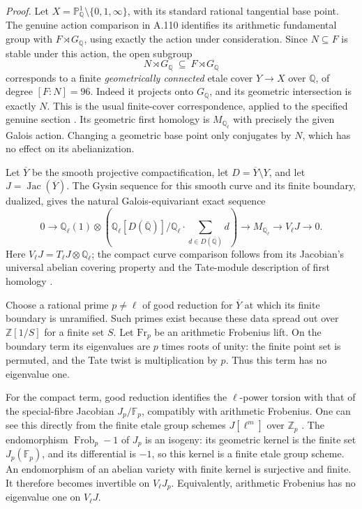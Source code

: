 \emph{Proof.}
Let $X=\mathbb P^1_{\mathbb Q}\setminus\{0,1,\infty\}$,
with its standard rational tangential base point. The genuine
action comparison in A.110 identifies its arithmetic
fundamental group with $F\rtimes G_{\mathbb Q}$, using
exactly the action under consideration. Since $N\subseteq F$
is stable under this action, the open subgroup
\[
                  N\rtimes G_{\mathbb Q}
                  \ \subseteq\ F\rtimes G_{\mathbb Q}
\]
corresponds to a finite \emph{geometrically connected} etale
cover $Y\to X$ over $\mathbb Q$, of degree $[F:N]=96$.
Indeed it projects onto $G_{\mathbb Q}$, and its geometric
intersection is exactly $N$. This is the usual finite-cover
correspondence, applied to the specified genuine section
\cite[\S3]{LiftMilneLEC2013}. Its geometric first homology
is $M_{\mathbb Q_\ell}$ with precisely the given Galois
action. Changing a geometric base point only conjugates
by $N$, which has no effect on its abelianization.

Let $\overline Y$ be the smooth projective compactification,
let $D=\overline Y\setminus Y$, and let
$J=\operatorname{Jac}(\overline Y)$. The Gysin sequence
for this smooth curve and its finite boundary, dualized,
gives the natural Galois-equivariant exact sequence
\[
 0\longrightarrow
 \mathbb Q_\ell(1)\otimes
 \left(\mathbb Q_\ell[D(\overline{\mathbb Q})]
       /\mathbb Q_\ell\!\cdot\!\sum_{d\in D(\overline{\mathbb Q})}d\right)
 \longrightarrow M_{\mathbb Q_\ell}
 \longrightarrow V_\ell J\longrightarrow0.
\]
Here $V_\ell J=T_\ell J\otimes\mathbb Q_\ell$; the compact
curve comparison follows from its Jacobian's universal
abelian covering property and the Tate-module description
of first homology
\cite[Corollary~16.2]{LiftMilneLEC2013}
\cite[Proposition~9.1 and Corollary~9.6]{LiftMilneJac2021}
\cite[Theorem~15.1 and Remark~15.5]{LiftMilneAV2022}.

Choose a rational prime $p\ne\ell$ of good reduction for
$\overline Y$ at which its finite boundary is unramified.
Such primes exist because these data spread out over
$\mathbb Z[1/S]$ for a finite set $S$. Let $\mathrm{Fr}_p$
be an arithmetic Frobenius lift. On the boundary term its
eigenvalues are $p$ times roots of unity: the finite point set
is permuted, and the Tate twist is multiplication by $p$.
Thus this term has no eigenvalue one.

For the compact term, good reduction identifies the
$\ell$-power torsion with that of the special-fibre Jacobian
$J_p/\mathbb F_p$, compatibly with arithmetic Frobenius.
One can see this directly from the finite etale group schemes
$J[\ell^m]$ over $\mathbb Z_p$
\cite[Proposition~20.7]{LiftMilneAV2022}.
The endomorphism $\operatorname{Frob}_p-1$ of $J_p$ is an
isogeny: its geometric kernel is the finite set
$J_p(\mathbb F_p)$, and its differential is $-1$, so this
kernel is a finite etale group scheme. An endomorphism of an
abelian variety with finite kernel is surjective and finite.
It therefore becomes invertible on $V_\ell J_p$.
Equivalently, arithmetic Frobenius has no eigenvalue one
on $V_\ell J$.

